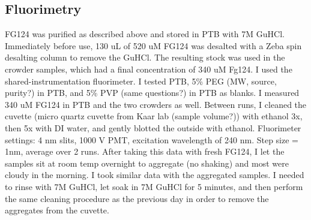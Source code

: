 \subsection{Fluorimetry}

FG124 was purified as described above and stored in PTB with 7M GuHCl.  Immediately before use, 130 uL of 520 uM FG124 was desalted with a Zeba spin desalting column to remove the GuHCl.  The resulting stock was used in the crowder samples, which had a final concentration of 340 uM Fg124.  I used the shared-instrumentation fluorimeter.  I tested PTB, 5\% PEG (MW, source, purity?) in PTB, and 5\% PVP (same questions?) in PTB as blanks.  I measured 340 uM FG124 in PTB and the two crowders as well.  Between runs, I cleaned the cuvette (micro quartz cuvette from Kaar lab (sample volume?)) with ethanol 3x, then 5x with DI water, and gently blotted the outside with ethanol.  Fluorimeter settings: 4 nm slits, 1000 V PMT, excitation wavelength of 240 nm.  Step size  = 1nm, average over 2 runs.  After taking this data with fresh FG124, I let the samples sit at room temp overnight to aggregate (no shaking) and most were cloudy in the morning.  I took similar data with the aggregated samples.  I needed to rinse with 7M GuHCl, let soak in 7M GuHCl for 5 minutes, and then perform the same cleaning procedure as the previous day in order to remove the aggregates from the cuvette.

